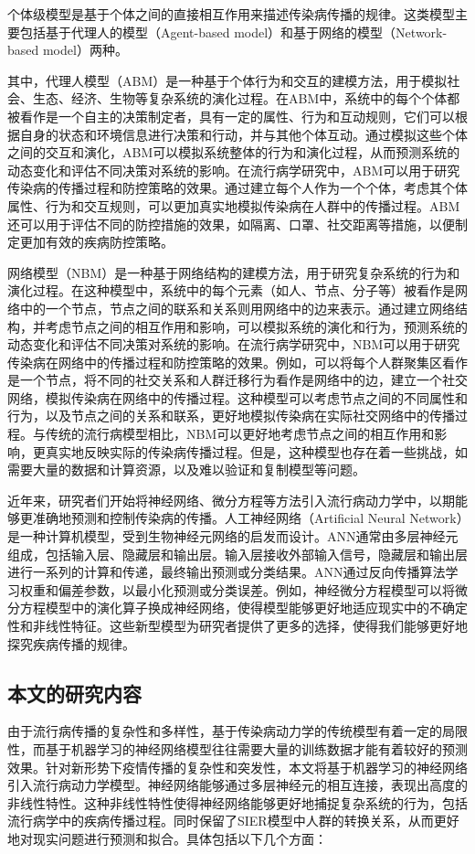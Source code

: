 个体级模型是基于个体之间的直接相互作用来描述传染病传播的规律。这类模型主要包括基于代理人的模型（Agent-based model）和基于网络的模型（Network-based model）两种。

其中，代理人模型（ABM）是一种基于个体行为和交互的建模方法，用于模拟社会、生态、经济、生物等复杂系统的演化过程。在ABM中，系统中的每个个体都被看作是一个自主的决策制定者，具有一定的属性、行为和互动规则，它们可以根据自身的状态和环境信息进行决策和行动，并与其他个体互动。通过模拟这些个体之间的交互和演化，ABM可以模拟系统整体的行为和演化过程，从而预测系统的动态变化和评估不同决策对系统的影响。在流行病学研究中，ABM可以用于研究传染病的传播过程和防控策略的效果。通过建立每个人作为一个个体，考虑其个体属性、行为和交互规则，可以更加真实地模拟传染病在人群中的传播过程。ABM还可以用于评估不同的防控措施的效果，如隔离、口罩、社交距离等措施，以便制定更加有效的疾病防控策略。

网络模型（NBM）是一种基于网络结构的建模方法，用于研究复杂系统的行为和演化过程。在这种模型中，系统中的每个元素（如人、节点、分子等）被看作是网络中的一个节点，节点之间的联系和关系则用网络中的边来表示。通过建立网络结构，并考虑节点之间的相互作用和影响，可以模拟系统的演化和行为，预测系统的动态变化和评估不同决策对系统的影响。在流行病学研究中，NBM可以用于研究传染病在网络中的传播过程和防控策略的效果。例如，可以将每个人群聚集区看作是一个节点，将不同的社交关系和人群迁移行为看作是网络中的边，建立一个社交网络，模拟传染病在网络中的传播过程。这种模型可以考虑节点之间的不同属性和行为，以及节点之间的关系和联系，更好地模拟传染病在实际社交网络中的传播过程。与传统的流行病模型相比，NBM可以更好地考虑节点之间的相互作用和影响，更真实地反映实际的传染病传播过程。但是，这种模型也存在着一些挑战，如需要大量的数据和计算资源，以及难以验证和复制模型等问题。

近年来，研究者们开始将神经网络、微分方程等方法引入流行病动力学中，以期能够更准确地预测和控制传染病的传播。人工神经网络（Artificial Neural Network）是一种计算机模型，受到生物神经元网络的启发而设计。ANN通常由多层神经元组成，包括输入层、隐藏层和输出层。输入层接收外部输入信号，隐藏层和输出层进行一系列的计算和传递，最终输出预测或分类结果。ANN通过反向传播算法学习权重和偏差参数，以最小化预测或分类误差。例如，神经微分方程模型可以将微分方程模型中的演化算子换成神经网络，使得模型能够更好地适应现实中的不确定性和非线性特征。这些新型模型为研究者提供了更多的选择，使得我们能够更好地探究疾病传播的规律。

\subsection{本文的研究内容}
由于流行病传播的复杂性和多样性，基于传染病动力学的传统模型有着一定的局限性，而基于机器学习的神经网络模型往往需要大量的训练数据才能有着较好的预测效果。针对新形势下疫情传播的复杂性和突发性，本文将基于机器学习的神经网络引入流行病动力学模型。神经网络能够通过多层神经元的相互连接，表现出高度的非线性特性。这种非线性特性使得神经网络能够更好地捕捉复杂系统的行为，包括流行病学中的疾病传播过程。同时保留了SIER模型中人群的转换关系，从而更好地对现实问题进行预测和拟合。具体包括以下几个方面：

